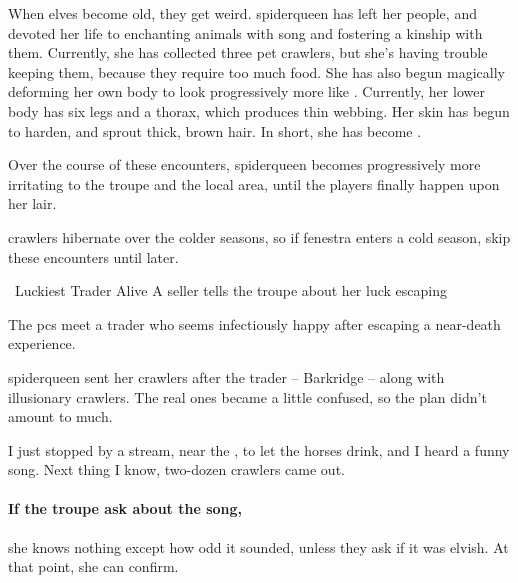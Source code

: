 \label{spiderSong}

\noindent
When elves become old, they get weird.
\Gls{spiderqueen} has left her people, and devoted her life to enchanting animals with song and fostering a kinship with them.
Currently, she has collected three pet \glspl{crawler}, but she's having trouble keeping them, because they require too much food.%
She has also begun magically deforming her own body to look progressively more like .
Currently, her lower body has six legs and a thorax, which produces thin webbing.
Her skin has begun to harden, and sprout thick, brown hair.
In short, she has become .

Over the course of these encounters, \gls{spiderqueen} becomes progressively more irritating to the troupe and the local area, until the players finally happen upon her lair.

\Glspl{crawler} hibernate over the colder seasons, so if \gls{fenestra} enters a cold season, skip these encounters until later.%

{\squash~Luckiest Trader Alive}%
{A seller tells the troupe about her luck escaping }%

The \glspl{pc} meet a trader who seems infectiously happy after escaping a near-death experience.

\begin{exampletext}
  \Gls{spiderqueen} sent her \glspl{crawler} after the trader -- Barkridge -- along with illusionary crawlers.
  The real ones became a little confused, so the plan didn't amount to much.
\end{exampletext}

\begin{boxtext}
  \begin{speechtext}
  I just stopped by a stream, near the , to let the horses drink, and I heard a funny song.
  Next thing I know, two-dozen crawlers came out.
  \end{speechtext}
\end{boxtext}

\paragraph{If the troupe ask about the song,}
she knows nothing except how odd it sounded, unless they ask if it was elvish.
At that point, she can confirm.

